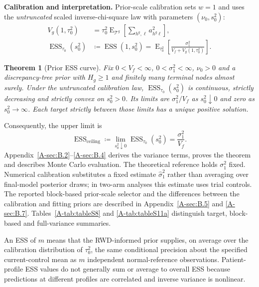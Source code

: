 \documentclass[11pt]{article}
\newcommand{\E}{\operatorname{E}}
\newcommand{\ESS}{\operatorname{ESS}}
\newtheorem{theorem}{Theorem}
\theoremstyle{remark}\newtheorem{remark}{Remark}[section]
\providecommand{\DIFdeltex}[1]{{\protect\color{red} \scriptsize #1}} %
\providecommand{\DIFdelbegin}{} %
\providecommand{\DIFdelend}{} %
\providecommand{\DIFdel}[1]{\texorpdfstring{\DIFdeltex{#1}}{}} %
\begin{document}
\DIFdelbegin %
\DIFdel{\textbf{Calibration and interpretation.}
}\DIFdelend Prior-scale calibration sets $w=1$ and uses the \emph{untruncated} scaled inverse-chi-square law with parameters $(\nu_0,s_0^2)$:
\begin{equation}\label{eq:essspike}
\begin{aligned}
V_g(1,\tau_0^2)
&=\tau_0^2\E_{\mathcal T^g}\!\left[\sum_{h^g,\ell}a_{h^g\ell}^2\right],\\
\ESS_{\tau_0}(s_0^2)
&\coloneqq\ESS(1,s_0^2)
=\E_{\tau_0^2}\!\left[\frac{\sigma_{1}^2}{V_f+V_g(1,\tau_0^2)}\right].
\end{aligned}
\end{equation}
\begin{theorem}[Prior ESS curve]\label{thm:ess}
Fix $0<V_f<\infty$, $0<\sigma_{1}^2<\infty$, $\nu_0>0$ and a discrepancy-tree prior with $H_g\geq1$ and finitely many terminal nodes almost surely. Under the untruncated calibration law, $\ESS_{\tau_0}(s_0^2)$ is continuous, strictly decreasing and strictly convex on $s_0^2>0$. Its limits are $\sigma_{1}^2/V_f$ as $s_0^2\downarrow0$ and zero as $s_0^2\to\infty$. Each target strictly between those limits has a unique positive solution.
\end{theorem}
Consequently, the upper limit is
\begin{equation}\label{eq:ceiling}
\ESS_{\mathrm{ceiling}}\coloneqq \lim_{s_0^2\downarrow0}\ESS_{\tau_0}(s_0^2)=\frac{\sigma_{1}^2}{V_f}.
\end{equation}
Appendix~\ref{A-sec:B.2}--\ref{A-sec:B.4} derives the variance terms, proves the theorem and describes Monte Carlo evaluation. The theoretical reference holds $\sigma_{1}^2$ fixed. Numerical calibration substitutes a fixed estimate $\widehat\sigma_{1}^2$ rather than averaging over final-model posterior draws; in two-arm analyses this estimate uses trial controls. The reported block-based prior-scale selector and the differences between the calibration and fitting priors are described in Appendix~\ref{A-sec:B.5} and \ref{A-sec:B.7}. Tables~\ref{A-tab:tableS8} and \ref{A-tab:tableS11a} distinguish target, block-based and full-variance summaries.

An ESS of $m$ means that the RWD-informed prior supplies, on average over the calibration distribution of $\tau_0^2$, the same conditional precision about the specified current-control mean as $m$ independent normal-reference observations. Patient-profile ESS values do not generally sum or average to overall ESS because predictions at different profiles are correlated and inverse variance is nonlinear.
\end{document}
